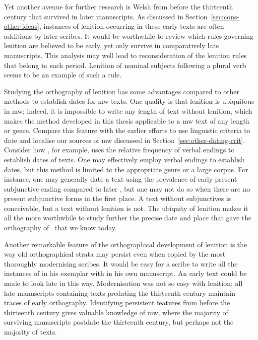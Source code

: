 Yet another avenue for further research is Welsh from before the thirteenth century that survived in later manuscripts. As discussed in Section~\ref{sec:cons-other-ideas}, instances of lenition occurring in these early texts are often additions by later scribes. It would be worthwhile to review which rules governing lenition are believed to be early, yet only survive in comparatively late manuscripts. This analysis may well lead to reconsideration of the lenition rules that belong to each period. Lenition of nominal subjects following a plural verb seems to be an example of such a rule.

Studying the orthography of lenition has some advantages compared to other methods to establish dates for \gls{mw} texts.
One quality is that lenition is ubiquitous in  \gls{mw}; indeed, it is impossible to write any length of text without lenition, which makes the method developed in this thesis applicable to a \gls{mw} text of any length or genre. Compare  this feature with the earlier efforts to use linguistic criteria to date and localise our sources of \gls{mw} discussed in Section~\ref{sec:other-dating-crit}. Consider how \textcite{rodway_dating_2013}, for example, uses the relative frequency of verbal endings to establish dates of texts. One may  effectively employ verbal endings to establish dates, but this method is limited to the appropriate genre or a large corpus. For instance, one may generally date a text using the prevalence of early present subjunctive ending  compared to later , but one may not do so when there are no present subjunctive forms in the first place. A text without subjunctives is conceivable, but a text without lenition is not. The ubiquity of lenition makes it all the more worthwhile to study further the precise date and place that gave the orthography of \lT\ that we know today.

Another remarkable feature of the orthographical development of lenition is the way old orthographical strata may persist even when copied by the most thoroughly modernising scribes. It would be easy for a scribe to write all the instances of  in his exemplar  with  in his own manuscript. An early text could be made to look late in this way. Modernisation was not so easy with lenition; all late manuscripts containing texts predating the thirteenth century maintain traces of early orthography. Identifying persistent features from before the thirteenth century gives valuable knowledge of \gls{mw}, where the majority of surviving manuscripts postdate the thirteenth century, but perhaps not the majority of texts.

